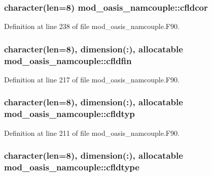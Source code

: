 \hypertarget{classmod__oasis__namcouple_a5e1d0d9b3d9f438102623d9643fbc704}{
\subsubsection[{cfldcor}]{\setlength{\rightskip}{0pt plus 5cm}character(len=8) mod\+\_\+oasis\+\_\+namcouple\+::cfldcor\hspace{0.3cm}{\ttfamily [private]}}}\label{classmod__oasis__namcouple_a5e1d0d9b3d9f438102623d9643fbc704}


Definition at line 238 of file mod\+\_\+oasis\+\_\+namcouple.\+F90.

\hypertarget{classmod__oasis__namcouple_aa387fcfde8c2538e22897b243ff5024c}{
\subsubsection[{cfldfin}]{\setlength{\rightskip}{0pt plus 5cm}character(len=8), dimension(\+:), allocatable mod\+\_\+oasis\+\_\+namcouple\+::cfldfin\hspace{0.3cm}{\ttfamily [private]}}}\label{classmod__oasis__namcouple_aa387fcfde8c2538e22897b243ff5024c}


Definition at line 217 of file mod\+\_\+oasis\+\_\+namcouple.\+F90.

\hypertarget{classmod__oasis__namcouple_ab139e7bad0413c79a5ad8e0837d3e0ef}{
\subsubsection[{cfldtyp}]{\setlength{\rightskip}{0pt plus 5cm}character(len=8), dimension(\+:), allocatable mod\+\_\+oasis\+\_\+namcouple\+::cfldtyp\hspace{0.3cm}{\ttfamily [private]}}}\label{classmod__oasis__namcouple_ab139e7bad0413c79a5ad8e0837d3e0ef}


Definition at line 211 of file mod\+\_\+oasis\+\_\+namcouple.\+F90.

\hypertarget{classmod__oasis__namcouple_af6d77b87036aa40faa1ae1ed1b2a0866}{
\subsubsection[{cfldtype}]{\setlength{\rightskip}{0pt plus 5cm}character(len=8), dimension(\+:), allocatable mod\+\_\+oasis\+\_\+namcouple\+::cfldtype\hspace{0.3cm}{\ttfamily [private]}}}\label{classmod__oasis__namcouple_af6d77b87036aa40faa1ae1ed1b2a0866}


